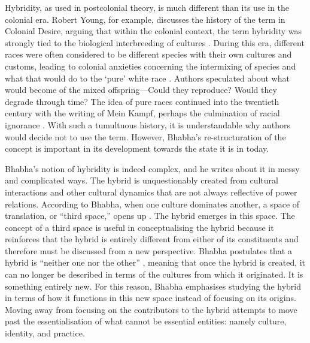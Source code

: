 	Hybridity, as used in postcolonial theory, is much different than its use in the colonial era. Robert Young, for example, discusses the history of the term in Colonial Desire, arguing that within the colonial context, the term hybridity was strongly tied to the biological interbreeding of cultures \parencite [6] {Young_1995}. During this era, different races were often considered to be different species with their own cultures and customs, leading to colonial anxieties concerning the intermixing of species and what that would do to the ‘pure’ white race \parencite [6] {Young_1995}. Authors speculated about what would become of the mixed offspring—Could they reproduce? Would they degrade through time\parencite [8] {Young_1995}?  The idea of pure races continued into the twentieth century with the writing of Mein Kampf, perhaps the culmination of racial ignorance \parencite [8] {Young_1995}. With such a tumultuous history, it is understandable why authors would decide not to use the term. However, Bhabha’s re-structuration of the concept is important in its development towards the state it is in today. 
	
	
	Bhabha’s notion of hybridity is indeed complex, and he writes about it in messy and complicated ways. The hybrid is unquestionably created from cultural interactions and other cultural dynamics that are not always reflective of power relations. According to Bhabha, when one culture dominates another, a space of translation, or “third space,” opens up \parencite[53] {Bhabha_1994}. The hybrid emerges in this space. The concept of a third space is useful in conceptualising the hybrid because it reinforces that the hybrid is entirely different from either of its constituents and therefore must be discussed from a new perspective. Bhabha postulates that a hybrid is “neither one nor the other” \parencite[49] {Bhabha_1994} , meaning that once the hybrid is created, it can no longer be described in terms of the cultures from which it originated. It is something entirely new. For this reason, Bhabha emphasises studying the hybrid in terms of how it functions in this new space instead of focusing on its origins. Moving away from focusing on the contributors to the hybrid attempts to move past the essentialisation of what cannot be essential entities: namely culture, identity, and practice. 
	
